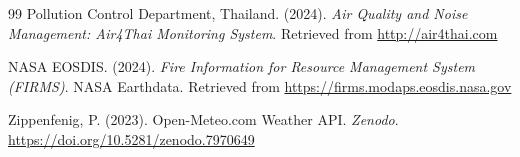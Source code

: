 \documentclass[12pt,a4paper]{report}
\begin{document}
\begin{thebibliography}{99}
Pollution Control Department, Thailand. (2024).
\textit{Air Quality and Noise Management: Air4Thai Monitoring System}.
Retrieved from \url{http://air4thai.com}

NASA EOSDIS. (2024).
\textit{Fire Information for Resource Management System (FIRMS)}.
NASA Earthdata. Retrieved from \url{https://firms.modaps.eosdis.nasa.gov}

Zippenfenig, P. (2023).
Open-Meteo.com Weather API.
\textit{Zenodo}. \url{https://doi.org/10.5281/zenodo.7970649}

\end{thebibliography}
\end{document}
